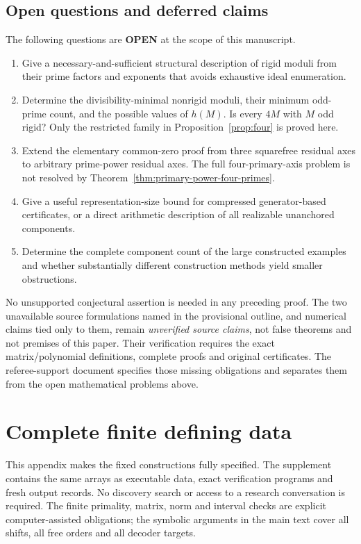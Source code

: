 \documentclass[11pt]{article}
\numberwithin{equation}{section}
\theoremstyle{definition}
\theoremstyle{remark}
\begin{document}
\subsection{Open questions and deferred claims}
The following questions are \textbf{OPEN} at the scope of this manuscript.
\begin{enumerate}[label=(\roman*)]
\item Give a necessary-and-sufficient structural description of rigid moduli from their prime factors and exponents that avoids exhaustive ideal enumeration.
\item Determine the divisibility-minimal nonrigid moduli, their minimum odd-prime count, and the possible values of $h(M)$. Is every $4M$ with $M$ odd rigid? Only the restricted family in Proposition~\ref{prop:four} is proved here.
\item Extend the elementary common-zero proof from three squarefree residual axes to arbitrary prime-power residual axes. The full four-primary-axis problem is not resolved by Theorem~\ref{thm:primary-power-four-primes}.
\item Give a useful representation-size bound for compressed generator-based certificates, or a direct arithmetic description of all realizable unanchored components.
\item Determine the complete component count of the large constructed examples and whether substantially different construction methods yield smaller obstructions.
\end{enumerate}
No unsupported conjectural assertion is needed in any preceding proof. The two unavailable source formulations named in the provisional outline, and numerical claims tied only to them, remain \emph{unverified source claims}, not false theorems and not premises of this paper. Their verification requires the exact matrix/polynomial definitions, complete proofs and original certificates. The referee-support document specifies those missing obligations and separates them from the open mathematical problems above.


\appendix

\section{Complete finite defining data}\label{v2:app:data}\label{vi:app:compute}
This appendix makes the fixed constructions fully specified. The supplement
contains the same arrays as executable data, exact verification programs and
fresh output records. No discovery search or access to a research conversation
is required. The finite primality, matrix, norm and interval checks are explicit
computer-assisted obligations; the symbolic arguments in the main text cover
all shifts, all free orders and all decoder targets.
\end{document}
